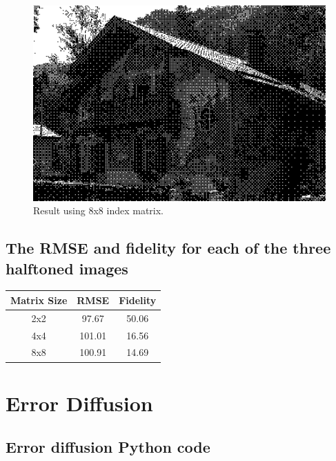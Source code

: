 \documentclass{article}
\begin{document}
\begin{figure}[H]
    \centering
    \includegraphics[width=1\textwidth]{../4-b8x8.png}
    \caption{Result using 8x8 index matrix.}
\end{figure}
\subsection{The RMSE and fidelity for each of the three halftoned images}
\begin{center}
    \begin{tabular}{|c|c|c|}
        \hline
        Matrix Size & RMSE & Fidelity \\
        \hline
        2x2 & 97.67 & 50.06 \\
        \hline
        4x4 & 101.01 & 16.56 \\
        \hline
        8x8 & 100.91 & 14.69 \\
        \hline
    \end{tabular}
\end{center}

\section{Error Diffusion}
\subsection{Error diffusion Python code}

\end{document}
